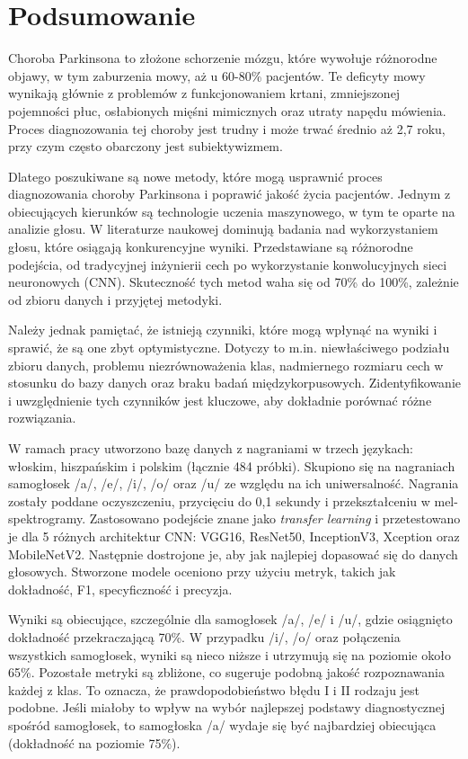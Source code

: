 \chapter{Podsumowanie}

Choroba Parkinsona to złożone schorzenie mózgu, które wywołuje różnorodne objawy, w tym zaburzenia mowy, aż u 60-80\% pacjentów.
Te deficyty mowy wynikają głównie z problemów z funkcjonowaniem krtani, zmniejszonej pojemności płuc, osłabionych mięśni mimicznych oraz utraty napędu mówienia. Proces diagnozowania tej choroby jest trudny i może trwać średnio aż 2,7 roku, przy czym często obarczony jest subiektywizmem.

Dlatego poszukiwane są nowe metody, które mogą usprawnić proces diagnozowania choroby Parkinsona i poprawić jakość życia pacjentów.
Jednym z obiecujących kierunków są technologie uczenia maszynowego, w tym te oparte na analizie głosu.
W literaturze naukowej dominują badania nad wykorzystaniem głosu, które osiągają konkurencyjne wyniki.
Przedstawiane są różnorodne podejścia, od tradycyjnej inżynierii cech po wykorzystanie konwolucyjnych sieci neuronowych (CNN).
Skuteczność tych metod waha się od 70\% do 100\%, zależnie od zbioru danych i przyjętej metodyki.

Należy jednak pamiętać, że istnieją czynniki, które mogą wpłynąć na wyniki i sprawić, że są one zbyt optymistyczne.
Dotyczy to m.in.
niewłaściwego podziału zbioru danych, problemu niezrównoważenia klas, nadmiernego rozmiaru cech w stosunku do bazy danych oraz braku badań międzykorpusowych.
Zidentyfikowanie i uwzględnienie tych czynników jest kluczowe, aby dokładnie porównać różne rozwiązania.

W ramach pracy utworzono bazę danych z nagraniami w trzech językach: włoskim, hiszpańskim i polskim (łącznie 484 próbki).
Skupiono się na nagraniach samogłosek /a/, /e/, /i/, /o/ oraz /u/ ze względu na ich uniwersalność.
Nagrania zostały poddane oczyszczeniu, przycięciu do 0,1 sekundy i przekształceniu w mel-spektrogramy.
Zastosowano podejście znane jako \emph{transfer learning} i przetestowano je dla 5 różnych architektur CNN: VGG16, ResNet50, InceptionV3, Xception oraz MobileNetV2.
Następnie dostrojone je, aby jak najlepiej dopasować się do danych głosowych.
Stworzone modele oceniono przy użyciu metryk, takich jak dokładność, F1, specyficzność i precyzja.

Wyniki są obiecujące, szczególnie dla samogłosek /a/, /e/ i /u/, gdzie osiągnięto dokładność przekraczającą 70\%.
W przypadku /i/, /o/ oraz połączenia wszystkich samogłosek, wyniki są nieco niższe i utrzymują się na poziomie około 65\%.
Pozostałe metryki są zbliżone, co sugeruje podobną jakość rozpoznawania każdej z klas.
To oznacza, że prawdopodobieństwo błędu I i II rodzaju jest podobne.
Jeśli miałoby to wpływ na wybór najlepszej podstawy diagnostycznej spośród samogłosek, to samogłoska /a/ wydaje się być najbardziej obiecująca (dokładność na poziomie 75\%).

